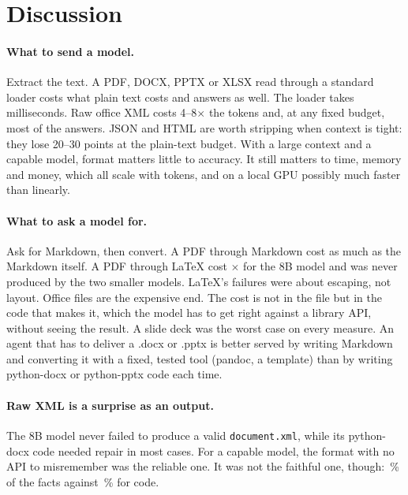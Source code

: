 \section{Discussion}
\label{sec:discussion}

\paragraph{What to send a model.} Extract the text. A PDF, DOCX, PPTX or
XLSX read through a standard loader costs what plain text costs and
answers as well. The loader takes milliseconds. Raw office XML costs
4--8$\times$ the tokens and, at any fixed budget, most of the answers. JSON
and HTML are worth stripping when context is tight: they lose 20--30
points at the plain-text budget. With a large context and a capable
model, format matters little to accuracy. It still matters to time,
memory and money, which all scale with tokens, and on a local GPU
possibly much faster than linearly.

\paragraph{What to ask a model for.} Ask for Markdown, then convert. A PDF
through Markdown cost as much as the Markdown itself. A PDF through LaTeX
cost \TaxPdfViaTex$\times$ for the 8B model and was never produced by the
two smaller models. LaTeX's failures were about escaping, not layout. Office files
are the expensive end. The cost is not in the file but in the code that
makes it, which the model has to get right against a library API, without
seeing the result. A slide deck was the worst case on every measure. An
agent that has to deliver a .docx or .pptx is better served by writing
Markdown and converting it with a fixed, tested tool (pandoc, a template)
than by writing python-docx or python-pptx code each time.

\paragraph{Raw XML is a surprise as an output.} The 8B model never failed
to produce a valid \texttt{document.xml}, while its python-docx code
needed repair in most cases. For a capable model, the format with no API
to misremember was the reliable one. It was not the faithful one, though:
\RecallDocxXml\,\% of the facts against \RecallDocxCode\,\% for code.

